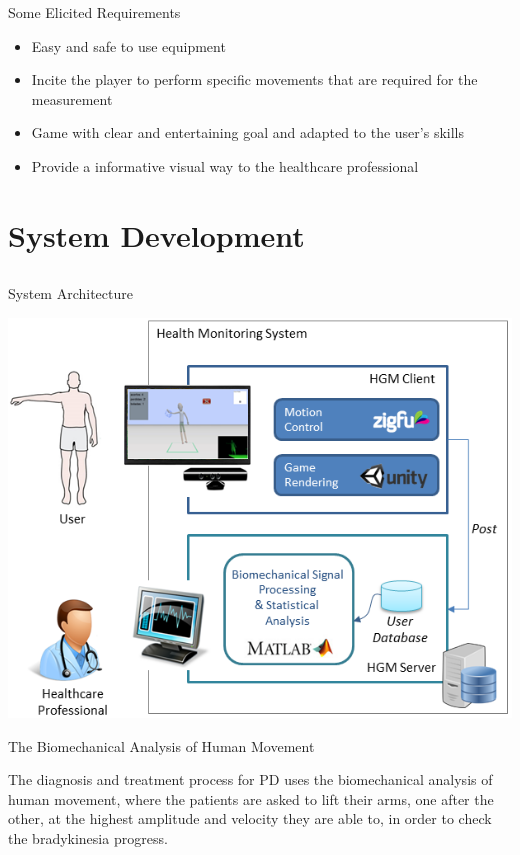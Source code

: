 \documentclass{beamer}
\begin{document}
\begin{frame}{Some Elicited Requirements}
	\begin{block}{}
		\begin{itemize}[<+->]
			\item	Easy and safe to use equipment
      \item Incite the player to perform specific movements that are required for the measurement 
      \item Game with clear and entertaining goal and adapted to the user's skills
			\item Provide a informative visual way to the healthcare professional
		\end{itemize}
	\end{block}
\end{frame}




\section{System Development}
\subsection{}
\begin{frame}{System Architecture}
		 \begin{block}{}
			\begin{center}
				\includegraphics[height=2.2 in]{img/systemarchitecture3.png}
			\end{center}
		 \end{block}
\end{frame}


\begin{frame}{The Biomechanical Analysis of Human Movement}
  \begin{block}{}
   The diagnosis and treatment process for PD uses the biomechanical analysis of human movement, where the patients are asked to lift their arms, one after the other, at the highest amplitude and velocity they are able to, in order to check the bradykinesia progress. 
  \end{block}
\end{frame}
\end{document}
